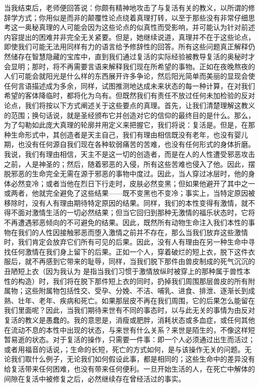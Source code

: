 当我结束后，老师便回答说：你颇有精神地攻击了与复活有关的教义，以所谓的修辞学方式；你用似是而非的颠覆性论点绕着真理打转，以至于那些没有非常仔细思考这一奥秘真理的人可能会因为这些论点的似真性而受影响，并可能认为针对前述内容提出的困难并非完全无关紧要。但是，她继续说道，真理并不在于这些论点，即使我们可能无法用同样有力的语言给予修辞性的回答。所有这些问题真正解释仍然储存在智慧隐藏的宝库中，直到我们通过复活的实际经验被教导复活的奥秘时才会显明；那时，将不再需要言语来解释我们现在所希望的事物。正如在夜晚熬夜的人们可能会就阳光是什么样的东西展开许多争论，然后阳光简单而美丽的显现会使任何言语描述成为多余，同样，试图推测地达成未来状态的每一种计算，在对我们希望的客体降临时，都将化为乌有。但既然我们有责任不放过任何未加检验的反对论点，我们将按以下方式阐述关于这些要点的真理。首先，让我们清楚理解这教义的范围；换句话说，就是圣经颁布它并创造对它的信仰的最终目的是什么。那么，为了勾勒如此庞大真理的轮廓并用定义来把握它，我们将说：复活是。但是，在那种生命形式中，其创造者是天主自己，我们有理由相信既没有老年，也没有婴儿期，也没有任何源自我们现在各种软弱痛苦的苦难，也没有任何形式的身体折磨。我说，我们有理由相信，天主不是这一切的创造者，而是在人的人性遭受邪恶攻击之前，人是神圣的；然后，随着邪恶的入侵，所有这些苦难也侵入了他。因此，摆脱邪恶的生命完全无需在源于邪恶的事物中度过。因此，当人穿过冰层时，他的身体必然变冷；或者当他在烈日下行走时，皮肤必然变黑；但如果他避开了其中之一或两者，他就完全避免了这些结果——既不变黑也不变冷；事实上，当特定原因被移除时，没有人有理由期待特定原因的结果。同样，我们的本性变得有激情，就不得不面对激情生活的一切必然结果；但当它回归到那种无激情的福乐状态时，它将不再遭遇邪恶倾向的不可避免的结果。因此，既然所有动物生命注入我们本性的事物在我们的人性因接触邪恶而堕入激情之前并不存在，那么当我们放弃这些激情时，我们肯定会放弃它们所有可见的后果。因此，没有人有理由在另一种生命中寻找任何激情在我们身上留下的后果。正如一个人，穿着破烂的短上衣，脱下这件衣服后，就不再感到它带来的耻辱，同样，当我们脱下那件由兽皮制成的死气沉沉的丑陋短上衣（因为我认为  是指当我们习惯于激情放纵时被穿上的那种属于兽性本性的构造）时，我们将在脱下那件短上衣的同时，扔掉我们周围那层兽皮的所有附属物；这些附属物包括性交、受孕、分娩、不洁、哺乳、进食、排泄、逐渐长到成熟、壮年、老年、疾病和死亡。如果那层皮不再在我们周围，它的后果怎么能留在我们里面呢？因此，当我们期待来世有不同的事态时，以与此无关的事情为由反对复活的教义是愚蠢的。我的意思是，消瘦或肥胖，消耗状态或多血症，或任何其他在流动不息的本性中出现的状态，与来世有什么关系？来世是陌生的，不像这样短暂易逝的状态。对于复活的操作，只需要一件事：即一个人必须通过出生而活过；或者用福音的话说，；生命的长短，死亡的方式如何，是与该操作无关的问题。无论我们取什么例子，无论我们如何假设此事，都是相同的；这些生命中的差异没有给复活带来任何困难，也没有带来任何便利。一旦开始生活的人，在死亡中解体的间隙在复活中被修复之后，必然继续存在曾经活过的事实。\par


